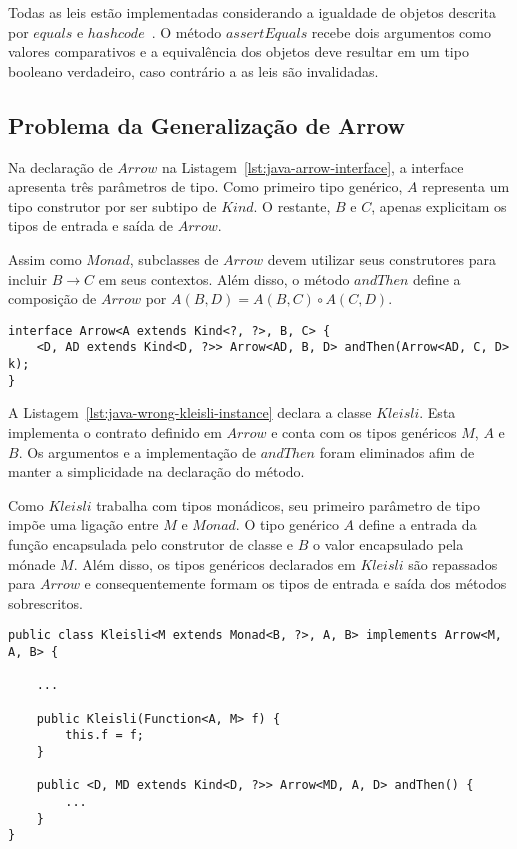 \documentclass[10pt, conference]{IEEEtran}
\begin{document}
Todas as leis estão implementadas considerando a igualdade de objetos descrita por $equals$ e $hashcode$~\cite{gosling1995java}. O método $assertEquals$ recebe dois argumentos como valores comparativos e a equivalência dos objetos deve resultar em um tipo booleano verdadeiro, caso contrário a as leis são invalidadas.

\subsection{Problema da Generalização de Arrow}

Na declaração de $Arrow$ na Listagem~\ref{lst:java-arrow-interface}, a interface apresenta três parâmetros de tipo. Como primeiro tipo genérico, $A$ representa um tipo construtor por ser subtipo de $Kind$. O restante, $B$ e $C$, apenas explicitam os tipos de entrada e saída de $Arrow$.

Assim como $Monad$, subclasses de $Arrow$ devem utilizar seus construtores para incluir $B \rightarrow C$ em seus contextos. Além disso, o método $andThen$ define a composição de $Arrow$ por $A(B, D) = A(B, C) \circ A(C, D)$.

\bigskip\bigskip\bigskip

\begin{lstlisting}[caption = {Interface $Arrow$}, label = {lst:java-arrow-interface}]
interface Arrow<A extends Kind<?, ?>, B, C> {
	<D, AD extends Kind<D, ?>> Arrow<AD, B, D> andThen(Arrow<AD, C, D> k);
}
\end{lstlisting}

A Listagem~\ref{lst:java-wrong-kleisli-instance} declara a classe $Kleisli$. Esta implementa o contrato definido em $Arrow$ e conta com os tipos genéricos $M$, $A$ e $B$. Os argumentos e a implementação de $andThen$ foram eliminados afim de manter a simplicidade na declaração do método.


Como $Kleisli$ trabalha com tipos monádicos, seu primeiro parâmetro de tipo impõe uma ligação entre $M$ e $Monad$. O tipo genérico $A$ define a entrada da função encapsulada pelo construtor de classe e $B$ o valor encapsulado pela mónade $M$. Além disso, os tipos genéricos declarados em $Kleisli$ são repassados para $Arrow$ e consequentemente formam os tipos de entrada e saída dos métodos sobrescritos.

\bigskip\bigskip\bigskip

\begin{lstlisting}[caption = {Implementação concreta da interface $Arrow$}, label = {lst:java-wrong-kleisli-instance}]
public class Kleisli<M extends Monad<B, ?>, A, B> implements Arrow<M, A, B> {

	...

	public Kleisli(Function<A, M> f) {
        this.f = f;
	}

	public <D, MD extends Kind<D, ?>> Arrow<MD, A, D> andThen() {
		...
	}
}
\end{lstlisting}
\end{document}
